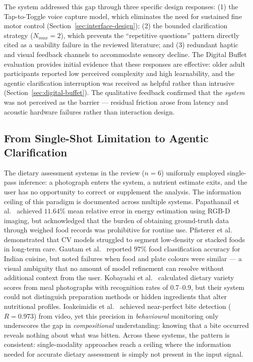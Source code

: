 The system addressed this gap through three specific design responses: (1) the Tap-to-Toggle voice capture model, which eliminates the need for sustained fine motor control (Section~\ref{sec:interface-design}); (2) the bounded clarification strategy ($N_{max}=2$), which prevents the ``repetitive questions'' pattern directly cited as a usability failure in the reviewed literature; and (3) redundant haptic and visual feedback channels to accommodate sensory decline. The Digital Buffet evaluation provides initial evidence that these responses are effective: older adult participants reported low perceived complexity and high learnability, and the agentic clarification interruption was received as helpful rather than intrusive (Section~\ref{sec:digital-buffet}). The qualitative feedback confirmed that the \emph{system} was not perceived as the barrier --- residual friction arose from latency and acoustic hardware failures rather than interaction design.

\subsection{From Single-Shot Limitation to Agentic Clarification}

The dietary assessment systems in the review ($n=6$) uniformly employed single-pass inference: a photograph enters the system, a nutrient estimate exits, and the user has no opportunity to correct or supplement the analysis. The information ceiling of this paradigm is documented across multiple systems. Papathanail et al.\ \citep{papathanailEvaluationNovelArtificial2021} achieved $11.64\%$ mean relative error in energy estimation using RGB-D imaging, but acknowledged that the burden of obtaining ground-truth data through weighed food records was prohibitive for routine use. Pfisterer et al.\ \citep{pfistererEnhancingFoodIntake2022} demonstrated that CV models struggled to segment low-density or stacked foods in long-term care. Gautam et al.\ \citep{gautamFoodAssessmentModel2022} reported $97\%$ food classification accuracy for Indian cuisine, but noted failures when food and plate colours were similar --- a visual ambiguity that no amount of model refinement can resolve without additional context from the user. Kobayashi et al.\ \citep{kobayashiFrailtyMeterHealthy2021} calculated dietary variety scores from meal photographs with recognition rates of 0.7--0.9, but their system could not distinguish preparation methods or hidden ingredients that alter nutritional profiles. Ioakeimidis et al.\ \citep{ioakeimidisCanBiteDetection2024} achieved near-perfect bite detection ($R=0.973$) from video, yet this precision in \emph{behavioural} monitoring only underscores the gap in \emph{compositional} understanding: knowing that a bite occurred reveals nothing about what was bitten. Across these systems, the pattern is consistent: single-modality approaches reach a ceiling where the information needed for accurate dietary assessment is simply not present in the input signal.

